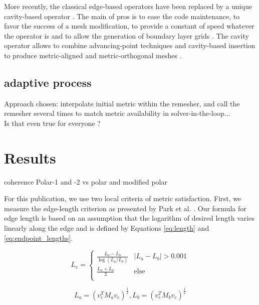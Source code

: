 \documentclass[3p,times,procedia,number]{elsarticle}
\begin{document}
More recently, the classical edge-based operators have been replaced by a unique cavity-based operator \cite{loseille-menier-imr22-cavity,loseille-menier-alauzet-para-adapt}.
The main of pros is to ease the code maintenance,
to favor the success of a mesh modification, to provide a constant of speed whatever the operator is and to allow the generation
of boundary layer grids \cite{loseille-lohner-imr21-robust-bl-gen}.
The cavity operator allows to combine advancing-point techniques
and cavity-based insertion to produce metric-aligned and metric-orthogonal meshes \cite{loseille-imr-metric-ortho-aniso-gen}.

{\color{blue}\subsection{adaptive process} 
Approach chosen: interpolate initial metric within the remesher, and call the remesher several times to match metric availability in solver-in-the-loop...\\
Is that even true for everyone ? }


\section{Results}
\label{sec:results}

{\color{blue} coherence Polar-1 and -2  vs polar and modified polar}

For this publication, we use two local criteria of metric satisfaction.
First, we measure the edge-length criterion as presented
by Park et al. \cite{park-loseille-krakos-michal-adapt-decomposition}.
Our formula for edge length is based on an assumption
that the logarithm of desired length varies linearly along the
edge \cite{alauzet-fead-2010-size-gradation-aniso} and is defined
by Equations \ref{eq:length} and \ref{eq:endpoint_lengths}.

\begin{equation}
\label{eq:length}
L_e = \begin{cases}
\frac{L_a - L_b}{\log(L_a / L_b)} & |L_a - L_b| > 0.001 \\
\frac{L_a + L_b}{2} & \text{else} \\
\end{cases}
\end{equation}

\begin{equation}
\label{eq:endpoint_lengths}
L_a = (v_e^T M_a v_e)^{\frac12},
L_b = (v_e^T M_b v_e)^{\frac12}
\end{equation}
\end{document}
